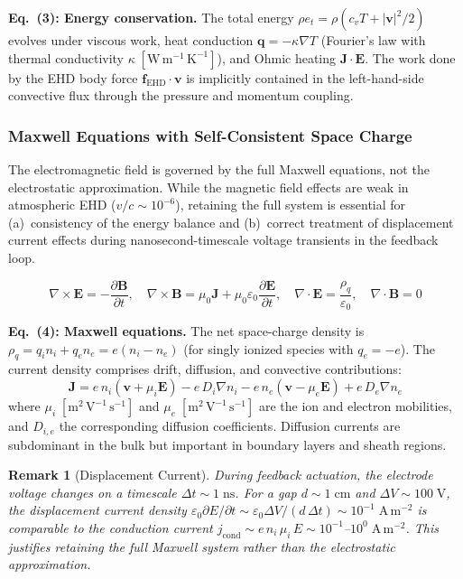 \documentclass[12pt,twocolumn]{article}
\newtheorem{remark}{Remark}
\newcommand{\ee}{\mathbf{E}}
\newcommand{\bb}{\mathbf{B}}
\newcommand{\jj}{\mathbf{J}}
\newcommand{\vv}{\mathbf{v}}
\newcommand{\ff}{\mathbf{f}}
\renewcommand{\qq}{\mathbf{q}}
\begin{document}
\noindent
\textbf{Eq.~(3): Energy conservation.} The total energy
$\rho e_t = \rho(c_v T + |\vv|^2/2)$ evolves under viscous work,
heat conduction $\qq = -\kappa\nabla T$ (Fourier's law with
thermal conductivity $\kappa\;[\mathrm{W\,m^{-1}\,K^{-1}}]$), and
Ohmic heating $\jj \cdot \ee$. The work done by the EHD body force
$\ff_{\mathrm{EHD}} \cdot \vv$ is implicitly contained in the
left-hand-side convective flux through the pressure and momentum
coupling.

\subsubsection{Maxwell Equations with Self-Consistent Space Charge}

The electromagnetic field is governed by the full Maxwell equations,
not the electrostatic approximation. While the magnetic field effects
are weak in atmospheric EHD ($v/c \sim 10^{-6}$), retaining the full
system is essential for (a)~consistency of the energy balance and
(b)~correct treatment of displacement current effects during
nanosecond-timescale voltage transients in the feedback loop.

\begin{equation}
\boxed{
  \nabla \times \ee = -\frac{\partial \bb}{\partial t}, \quad
  \nabla \times \bb = \mu_0 \jj
    + \mu_0 \varepsilon_0 \frac{\partial \ee}{\partial t}, \quad
  \nabla \cdot \ee = \frac{\rho_q}{\varepsilon_0}, \quad
  \nabla \cdot \bb = 0
}
\tag{4}
\label{eq:Maxwell}
\end{equation}

\noindent
\textbf{Eq.~(4): Maxwell equations.} The net space-charge density is
$\rho_q = q_i n_i + q_e n_e = e(n_i - n_e)$ (for singly ionized
species with $q_e = -e$). The current density comprises drift,
diffusion, and convective contributions:
\begin{equation}
  \jj = e\,n_i(\vv + \mu_i \ee) - e\,D_i\nabla n_i
      - e\,n_e(\vv - \mu_e \ee) + e\,D_e\nabla n_e
  \label{eq:current_density}
\end{equation}
where $\mu_i\;[\mathrm{m^2\,V^{-1}\,s^{-1}}]$ and
$\mu_e\;[\mathrm{m^2\,V^{-1}\,s^{-1}}]$ are the ion and electron
mobilities, and $D_{i,e}$ the corresponding diffusion coefficients.
Diffusion currents are subdominant in the bulk but important in
boundary layers and sheath regions.

\begin{remark}[Displacement Current]
\label{rem:displacement}
During feedback actuation, the electrode voltage changes on a
timescale $\Delta t \sim 1\;\mathrm{ns}$. For a gap $d \sim
1\;\mathrm{cm}$ and $\Delta V \sim 100\;\mathrm{V}$, the
displacement current density
$\varepsilon_0 \partial E/\partial t \sim \varepsilon_0 \Delta V /
(d\,\Delta t) \sim 10^{-1}\;\mathrm{A\,m^{-2}}$ is comparable to
the conduction current
$j_{\mathrm{cond}} \sim e\,n_i\,\mu_i\,E \sim 10^{-1}$--$10^{0}\;
\mathrm{A\,m^{-2}}$. This justifies retaining the full Maxwell
system rather than the electrostatic approximation.
\end{remark}
\end{document}
